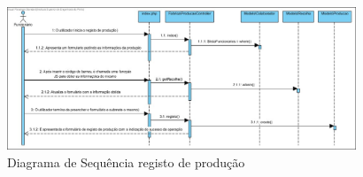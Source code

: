 \begin{figure}[h!] 
	\begin{center}
		\includegraphics[width=0.93\textwidth,keepaspectratio]{figuras/Diagramas_vp/SD_Fabrica_3_Registo_de_Producao.jpg}
		\caption{Diagrama de Sequência registo de produção}
		\label{fig:sd_producao} 
	\end{center}
\end{figure}
